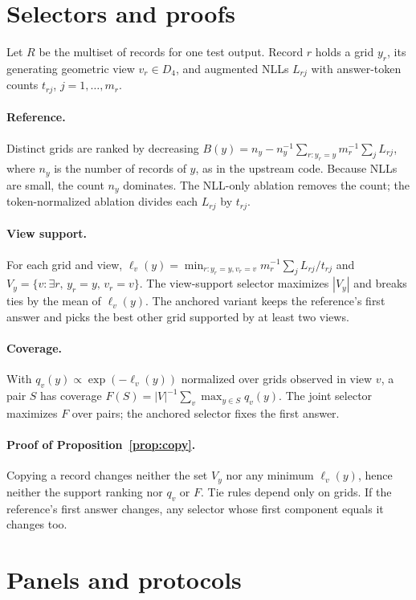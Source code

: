 \documentclass[10pt,twocolumn]{article}
\theoremstyle{plain}\newtheorem{proposition}{Proposition}
\theoremstyle{definition}\newtheorem{corollary}{Corollary}
\begin{document}
\clearpage
\appendix
\section{Selectors and proofs}\label{app:selectors}
Let $R$ be the multiset of records for one test output. Record $r$ holds a grid $y_r$, its generating geometric view $v_r\in D_4$, and augmented NLLs $L_{rj}$ with answer-token counts $t_{rj}$, $j=1,\dots,m_r$.

\paragraph{Reference.} Distinct grids are ranked by decreasing $B(y)=n_y-n_y^{-1}\sum_{r:y_r=y} m_r^{-1}\sum_j L_{rj}$, where $n_y$ is the number of records of $y$, as in the upstream code. Because NLLs are small, the count $n_y$ dominates. The NLL-only ablation removes the count; the token-normalized ablation divides each $L_{rj}$ by $t_{rj}$.

\paragraph{View support.} For each grid and view, $\ell_v(y)=\min_{r:y_r=y,v_r=v} m_r^{-1}\sum_j L_{rj}/t_{rj}$ and $V_y=\{v:\exists r,\,y_r=y,\,v_r=v\}$. The view-support selector maximizes $|V_y|$ and breaks ties by the mean of $\ell_v(y)$. The anchored variant keeps the reference's first answer and picks the best other grid supported by at least two views.

\paragraph{Coverage.} With $q_v(y)\propto\exp(-\ell_v(y))$ normalized over grids observed in view $v$, a pair $S$ has coverage $F(S)=|V|^{-1}\sum_v\max_{y\in S}q_v(y)$. The joint selector maximizes $F$ over pairs; the anchored selector fixes the first answer.

\paragraph{Proof of Proposition~\ref{prop:copy}.} Copying a record changes neither the set $V_y$ nor any minimum $\ell_v(y)$, hence neither the support ranking nor $q_v$ or $F$. Tie rules depend only on grids. If the reference's first answer changes, any selector whose first component equals it changes too.

\section{Panels and protocols}\label{app:protocol}
\end{document}

